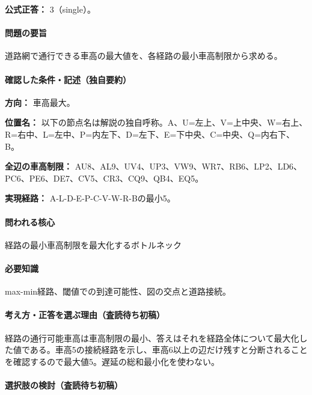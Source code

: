 \textbf{公式正答：} 3（single）。

\paragraph{問題の要旨} 道路網で通行できる車高の最大値を、各経路の最小車高制限から求める。

\paragraph{確認した条件・記述（独自要約）}\mbox{}\par

\noindent\textbf{方向：} 車高最大。\par

\noindent\textbf{位置名：} 以下の節点名は解説の独自呼称。A、U=左上、V=上中央、W=右上、R=右中、L=左中、P=内左下、D=左下、E=下中央、C=中央、Q=内右下、B。\par

\noindent\textbf{全辺の車高制限：} AU8、AL9、UV4、UP3、VW9、WR7、RB6、LP2、LD6、PC6、PE6、DE7、CV5、CR3、CQ9、QB4、EQ5。\par

\noindent\textbf{実現経路：} A-L-D-E-P-C-V-W-R-Bの最小5。\par

\paragraph{問われる核心} 経路の最小車高制限を最大化するボトルネック

\paragraph{必要知識} max-min経路、閾値での到達可能性、図の交点と道路接続。

\paragraph{考え方・正答を選ぶ理由（査読待ち初稿）} 経路の通行可能車高は車高制限の最小、答えはそれを経路全体について最大化した値である。車高5の接続経路を示し、車高6以上の辺だけ残すと分断されることを確認するので最大値5。遅延の総和最小化を使わない。

\paragraph{選択肢の検討（査読待ち初稿）}\mbox{}\par

